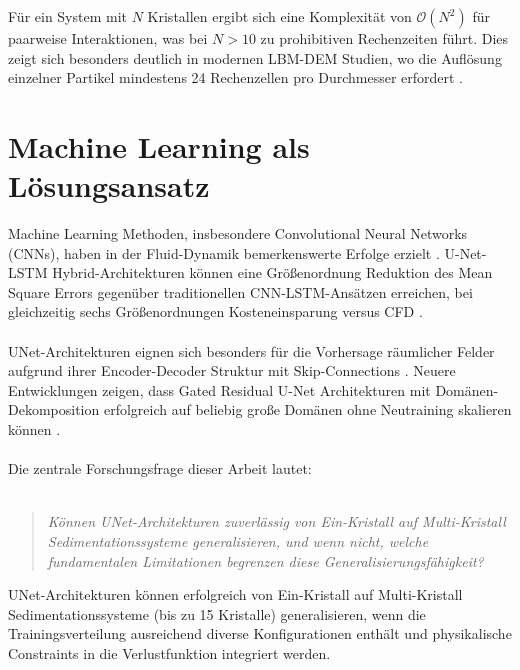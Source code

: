 Für ein System mit $N$ Kristallen ergibt sich eine Komplexität von $\mathcal{O}(N^2)$ für paarweise Interaktionen, was bei $N > 10$ zu prohibitiven Rechenzeiten führt. Dies zeigt sich besonders deutlich in modernen LBM-DEM Studien, wo die Auflösung einzelner Partikel mindestens 24 Rechenzellen pro Durchmesser erfordert \parencite{zeng2014coupled}.

\section{Machine Learning als Lösungsansatz}

Machine Learning Methoden, insbesondere Convolutional Neural Networks (CNNs), haben in der Fluid-Dynamik bemerkenswerte Erfolge erzielt \parencite{thuerey2020deep}. U-Net-LSTM Hybrid-Architekturen können eine Größenordnung Reduktion des Mean Square Errors gegenüber traditionellen CNN-LSTM-Ansätzen erreichen, bei gleichzeitig sechs Größenordnungen Kosteneinsparung versus CFD \parencite{hou2022unet_lstm}.\\
\\
UNet-Architekturen eignen sich besonders für die Vorhersage räumlicher Felder aufgrund ihrer Encoder-Decoder Struktur mit Skip-Connections \parencite{ronneberger2015unet}. Neuere Entwicklungen zeigen, dass Gated Residual U-Net Architekturen mit Domänen-Dekomposition erfolgreich auf beliebig große Domänen ohne Neutraining skalieren können \parencite{rana2024scalable_cnn}.\\
\\
Die zentrale Forschungsfrage dieser Arbeit lautet:\\
\\
\begin{quote}
\textit{Können UNet-Architekturen zuverlässig von Ein-Kristall auf Multi-Kristall Sedimentationssysteme generalisieren, und wenn nicht, welche fundamentalen Limitationen begrenzen diese Generalisierungsfähigkeit?}
\end{quote}

\begin{hypothesis}
\label{hyp:generalization}
UNet-Architekturen können erfolgreich von Ein-Kristall auf Multi-Kristall Sedimentationssysteme (bis zu 15 Kristalle) generalisieren, wenn die Trainingsverteilung ausreichend diverse Konfigurationen enthält und physikalische Constraints in die Verlustfunktion integriert werden.
\end{hypothesis}

